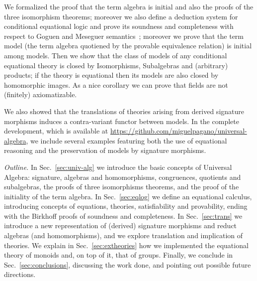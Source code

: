 We formalized the proof that the term algebra is initial and also the
proofs of the three isomorphism theorems; moreover we also define a
deduction system for conditional equational logic and prove its
soundness and completeness with respect to Goguen and Meseguer
semantics~\citeyearpar{GoguenM82}; moreover we prove that the term model (the
term algebra quotiened by the provable equivalence relation) is
initial among models. Then we show that the class of models of any
conditional equational theory is closed by Isomorphisms, Subalgebras
and (arbitrary) products; if the theory is equational then its models
are also closed by homomorphic images. As a nice corollary we can
prove that fields are not (finitely) axiomatizable.

We also showed that the translations of theories arising from derived
signature morphisms induces a contra-variant functor between models.
In the complete development, which is available at
\url{https://github.com/miguelpagano/universal-algebra}, we
include several examples featuring both the use of equational
reasoning and the preservation of models by signature morphisms.

\textit{Outline.} In Sec.~\ref{sec:univ-alg} we introduce the basic
concepts of Universal Algebra: signature, algebras and homomorphisms,
congruences, quotients and subalgebras, the proofs of three
isomorphisms theorems, and the proof of the initiality of the term
algebra.  In Sec.~\ref{sec:eqlog} we define an equational calculus,
introducing concepts of equations, theories, satisfiability and
provability, ending with the Birkhoff proofs of soundness and
completeness.  In Sec.~\ref{sec:trans} we introduce a new
representation of (derived) signature morphisms and reduct algebras
(and homomorphisms), and we explore translation and implication of
theories. We explain in Sec.~\ref{sec:extheories} how we implemented
the equational theory of monoids and, on top of it, that of groups.
Finally, we conclude in Sec.~\ref{sec:conclusions}, discussing the
work done, and pointing out possible future directions.
